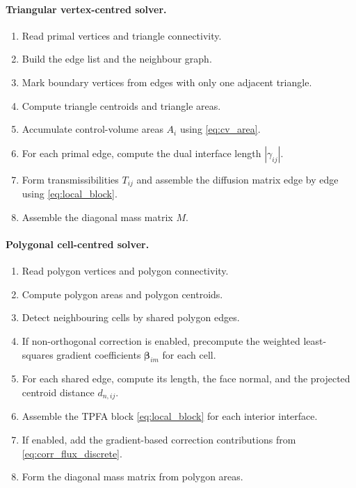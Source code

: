 \documentclass[11pt]{article}
\theoremstyle{plain}
\theoremstyle{definition}
\theoremstyle{remark}
\numberwithin{equation}{section}
\begin{document}
\paragraph{Triangular vertex-centred solver.}
\begin{enumerate}[label=\arabic*.]
\item Read primal vertices and triangle connectivity.
\item Build the edge list and the neighbour graph.
\item Mark boundary vertices from edges with only one adjacent triangle.
\item Compute triangle centroids and triangle areas.
\item Accumulate control-volume areas $A_i$ using \cref{eq:cv_area}.
\item For each primal edge, compute the dual interface length $|\gamma_{ij}|$.
\item Form transmissibilities $T_{ij}$ and assemble the diffusion matrix edge by edge using \cref{eq:local_block}.
\item Assemble the diagonal mass matrix $M$.
\end{enumerate}

\paragraph{Polygonal cell-centred solver.}
\begin{enumerate}[label=\arabic*.]
\item Read polygon vertices and polygon connectivity.
\item Compute polygon areas and polygon centroids.
\item Detect neighbouring cells by shared polygon edges.
\item If non-orthogonal correction is enabled, precompute the weighted least-squares gradient coefficients $\bm{\beta}_{im}$ for each cell.
\item For each shared edge, compute its length, the face normal, and the projected centroid distance $d_{n,ij}$.
\item Assemble the TPFA block \cref{eq:local_block} for each interior interface.
\item If enabled, add the gradient-based correction contributions from \cref{eq:corr_flux_discrete}.
\item Form the diagonal mass matrix from polygon areas.
\end{enumerate}
\end{document}
